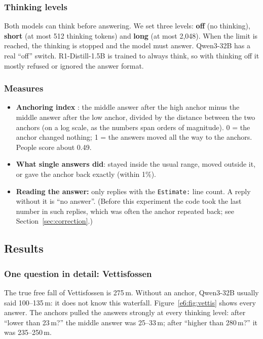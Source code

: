 \documentclass[11pt,a4paper]{article}
\begin{document}
\subsubsection{Thinking levels}
Both models can think before answering. We set three levels: \textbf{off} (no thinking), \textbf{short} (at most 512 thinking tokens) and \textbf{long} (at most 2,048). When the limit is reached, the thinking is stopped and the model must answer. Qwen3-32B has a real \enquote{off} switch. R1-Distill-1.5B is trained to always think, so with thinking off it mostly refused or ignored the answer format.

\subsubsection{Measures}
\begin{itemize}[leftmargin=*]
  \item \textbf{Anchoring index} \citep{jacowitz1995measures}: the middle answer after the high anchor minus the middle answer after the low anchor, divided by the distance between the two anchors (on a log scale, as the numbers span orders of magnitude). 0 = the anchor changed nothing; 1 = the answers moved all the way to the anchors. People score about 0.49.
  \item \textbf{What single answers did}: stayed inside the usual range, moved outside it, or gave the anchor back exactly (within 1\%).
  \item \textbf{Reading the answer:} only replies with the \texttt{Estimate:} line count. A reply without it is \enquote{no answer}. (Before this experiment the code took the last number in such replies, which was often the anchor repeated back; see Section~\ref{sec:correction}.)
\end{itemize}

\subsection{Results}

\subsubsection{One question in detail: Vettisfossen}

The true free fall of Vettisfossen is 275\,m. Without an anchor, Qwen3-32B usually said 100--135\,m: it does not know this waterfall. Figure~\ref{e6:fig:vettis} shows every answer. The anchors pulled the answers strongly at every thinking level: after \enquote{lower than 23\,m?} the middle answer was 25--33\,m; after \enquote{higher than 280\,m?} it was 235--250\,m.
\end{document}
